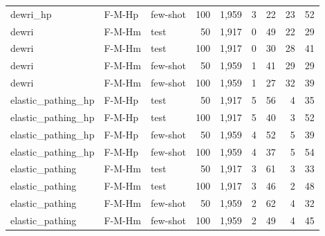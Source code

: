 \begin{table}[t]
\begin{tabular}{lllrrrrrr}
dewri\_hp & F-M-Hp & few-shot & 100 & 1{,}959 & 3 & 22 & 23 & 52 \\
dewri & F-M-Hm & test & 50 & 1{,}917 & 0 & 49 & 22 & 29 \\
dewri & F-M-Hm & test & 100 & 1{,}917 & 0 & 30 & 28 & 41 \\
dewri & F-M-Hm & few-shot & 50 & 1{,}959 & 1 & 41 & 29 & 29 \\
dewri & F-M-Hm & few-shot & 100 & 1{,}959 & 1 & 27 & 32 & 39 \\
elastic\_pathing\_hp & F-M-Hp & test & 50 & 1{,}917 & 5 & 56 & 4 & 35 \\
elastic\_pathing\_hp & F-M-Hp & test & 100 & 1{,}917 & 5 & 40 & 3 & 52 \\
elastic\_pathing\_hp & F-M-Hp & few-shot & 50 & 1{,}959 & 4 & 52 & 5 & 39 \\
elastic\_pathing\_hp & F-M-Hp & few-shot & 100 & 1{,}959 & 4 & 37 & 5 & 54 \\
elastic\_pathing & F-M-Hm & test & 50 & 1{,}917 & 3 & 61 & 3 & 33 \\
elastic\_pathing & F-M-Hm & test & 100 & 1{,}917 & 3 & 46 & 2 & 48 \\
elastic\_pathing & F-M-Hm & few-shot & 50 & 1{,}959 & 2 & 62 & 4 & 32 \\
elastic\_pathing & F-M-Hm & few-shot & 100 & 1{,}959 & 2 & 49 & 4 & 45 \\
\bottomrule\end{tabular}
\end{table}
